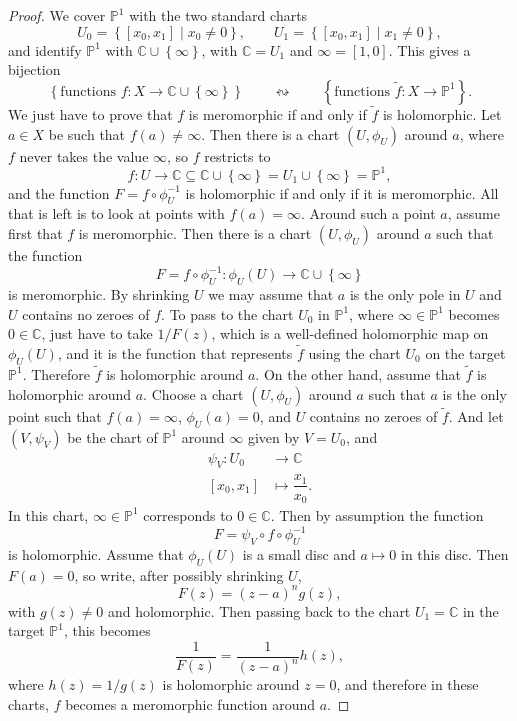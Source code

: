 \documentclass{article}
\newcommand{\C}{\mathbb{C}}
\renewcommand{\P}{\mathbb{P}}
\newcommand{\rb}[1]{\left( #1 \right)}
\renewcommand{\sb}[1]{\left[ #1 \right]}
\newcommand{\cb}[1]{\left\{ #1 \right\}}
\theoremstyle{definition}\newtheorem{definition}{Definition}[section]
\theoremstyle{definition}\newtheorem{notation}[definition]{Notation}
\theoremstyle{definition}\newtheorem{remark}[definition]{Remark}
\theoremstyle{definition}\newtheorem{example1}[definition]{Example}
\theoremstyle{definition}\newtheorem{fact}{Fact}
\theoremstyle{definition}\newtheorem{exercise}{Exercise}
\theoremstyle{definition}\newtheorem*{example2}{Example}
\begin{document}
\begin{proof}
We cover $ \P^1 $ with the two standard charts
$$ U_0 = \cb{\sb{x_0, x_1} \mid x_0 \ne 0}, \qquad U_1 = \cb{\sb{x_0, x_1} \mid x_1 \ne 0}, $$
and identify $ \P^1 $ with $ \C \cup \cb{\infty} $, with $ \C = U_1 $ and $ \infty = \sb{1, 0} $. This gives a bijection
$$ \cb{\text{functions } f : X \to \C \cup \cb{\infty}} \qquad \leftrightsquigarrow \qquad \cb{\text{functions } \widetilde{f} : X \to \P^1}. $$
We just have to prove that $ f $ is meromorphic if and only if $ \widetilde{f} $ is holomorphic. Let $ a \in X $ be such that $ f\rb{a} \ne \infty $. Then there is a chart $ \rb{U, \phi_U} $ around $ a $, where $ f $ never takes the value $ \infty $, so $ f $ restricts to
$$ f : U \to \C \subseteq \C \cup \cb{\infty} = U_1 \cup \cb{\infty} = \P^1, $$
and the function $ F = f \circ \phi_U^{-1} $ is holomorphic if and only if it is meromorphic. All that is left is to look at points with $ f\rb{a} = \infty $. Around such a point $ a $, assume first that $ f $ is meromorphic. Then there is a chart $ \rb{U, \phi_U} $ around $ a $ such that the function
$$ F = f \circ \phi_U^{-1} : \phi_U\rb{U} \to \C \cup \cb{\infty} $$
is meromorphic. By shrinking $ U $ we may assume that $ a $ is the only pole in $ U $ and $ U $ contains no zeroes of $ f $. To pass to the chart $ U_0 $ in $ \P^1 $, where $ \infty \in \P^1 $ becomes $ 0 \in \C $, just have to take $ 1 / F\rb{z} $, which is a well-defined holomorphic map on $ \phi_U\rb{U} $, and it is the function that represents $ \widetilde{f} $ using the chart $ U_0 $ on the target $ \P^1 $. Therefore $ \widetilde{f} $ is holomorphic around $ a $. On the other hand, assume that $ \widetilde{f} $ is holomorphic around $ a $. Choose a chart $ \rb{U, \phi_U} $ around $ a $ such that $ a $ is the only point such that $ f\rb{a} = \infty $, $ \phi_U\rb{a} = 0 $, and $ U $ contains no zeroes of $ \widetilde{f} $. And let $ \rb{V, \psi_V} $ be the chart of $ \P^1 $ around $ \infty $ given by $ V = U_0 $, and
\begin{align*}
\psi_V : U_0 & \to \C \\
\sb{x_0, x_1} & \mapsto \dfrac{x_1}{x_0}.
\end{align*}
In this chart, $ \infty \in \P^1 $ corresponds to $ 0 \in \C $. Then by assumption the function
$$ F = \psi_V \circ f \circ \phi_U^{-1} $$
is holomorphic. Assume that $ \phi_U\rb{U} $ is a small disc and $ a \mapsto 0 $ in this disc. Then $ F\rb{a} = 0 $, so write, after possibly shrinking $ U $,
$$ F\rb{z} = \rb{z - a}^ng\rb{z}, $$
with $ g\rb{z} \ne 0 $ and holomorphic. Then passing back to the chart $ U_1 = \C $ in the target $ \P^1 $, this becomes
$$ \dfrac{1}{F\rb{z}} = \dfrac{1}{\rb{z - a}^n}h\rb{z}, $$
where $ h\rb{z} = 1 / g\rb{z} $ is holomorphic around $ z = 0 $, and therefore in these charts, $ f $ becomes a meromorphic function around $ a $.
\end{proof}
\end{document}
